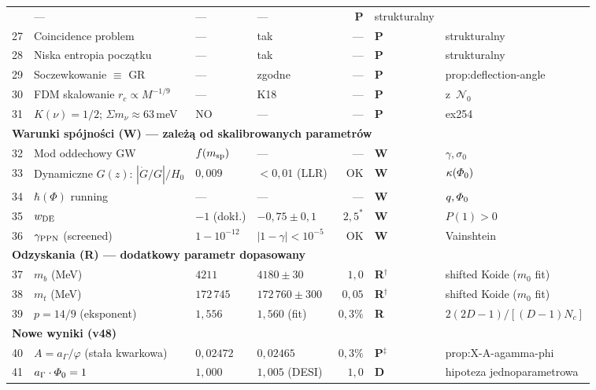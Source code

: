 \begin{center}
\begin{longtable}{@{}rp{3.8cm}llrll@{}}
   & --- & --- & --- & \textbf{P} & strukturalny \\
27 & Coincidence problem
   & --- & tak & --- & \textbf{P} & strukturalny \\
28 & Niska entropia pocz\k{a}tku
   & --- & tak & --- & \textbf{P} & strukturalny \\
29 & Soczewkowanie $\equiv$ GR
   & --- & zgodne & --- & \textbf{P} & prop:deflection-angle \\
30 & FDM skalowanie $r_c \propto M^{-1/9}$
   & --- & K18 & --- & \textbf{P} & z~$\mathcal{N}_0$ \\
%
31 & $K(\nu) = 1/2$; $\Sigma m_\nu \approx 63$\,meV
   & NO & --- & --- & \textbf{P} & ex254 \\
%
\midrule
%
%
\multicolumn{7}{l}{\textbf{Warunki sp\'ojno\'sci (W) --- zale\.z\k{a} od skalibrowanych parametr\'ow}} \\
\midrule
32 & Mod oddechowy GW
   & $f(m_{\rm sp})$ & --- & --- & \textbf{W} & $\gamma, \sigma_0$ \\
33 & Dynamiczne $G(z)$: $|\dot{G}/G|/H_0$
   & $0{,}009$ & $< 0{,}01$ (LLR) & OK & \textbf{W} & $\kappa(\varPhi_0)$ \\
34 & $\hbar(\Phi)$ running
   & --- & --- & --- & \textbf{W} & $q, \varPhi_0$ \\
35 & $w_{\rm DE}$
   & $-1$ (dok\l{}.) & $-0{,}75 \pm 0{,}1$ & $2{,}5^*$ & \textbf{W} & $P(1) > 0$ \\
36 & $\gamma_{\rm PPN}$ (screened)
   & $1 - 10^{-12}$ & $|1-\gamma| < 10^{-5}$ & OK & \textbf{W} & Vainshtein \\
%
\midrule
%
%
\multicolumn{7}{l}{\textbf{Odzyskania (R) --- dodatkowy parametr dopasowany}} \\
\midrule
37 & $m_b$ (MeV)
   & $4211$ & $4180 \pm 30$ & $1{,}0$ & \textbf{R}$^\dagger$ & shifted Koide ($m_0$ fit) \\
38 & $m_t$ (MeV)
   & $172\,745$ & $172\,760 \pm 300$ & $0{,}05$ & \textbf{R}$^\dagger$ & shifted Koide ($m_0$ fit) \\
39 & $p = 14/9$ (eksponent)
   & $1{,}556$ & $1{,}560$ (fit) & $0{,}3\%$ & \textbf{R} & $2(2D{-}1)/[(D{-}1)N_c]$ \\
%
\midrule
%
%
\multicolumn{7}{l}{\textbf{Nowe wyniki (v48)}} \\
\midrule
40 & $A = a_\Gamma / \varphi$ (sta\l{}a kwarkowa)
   & $0{,}02472$ & $0{,}02465$ & $0{,}3\%$ & \textbf{P}$^\ddagger$ & prop:X-A-agamma-phi \\
41 & $a_\Gamma \cdot \varPhi_0 = 1$
   & $1{,}000$ & $1{,}005$ (DESI) & $1{,}0$ & \textbf{D} & hipoteza jednoparametrowa \\
%
\end{longtable}
\end{center}

